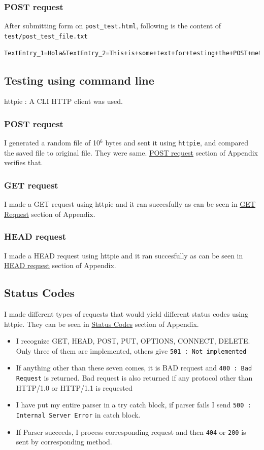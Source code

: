 \documentclass[11pt]{article}
\begin{document}
\subsubsection{POST request}
\label{sec:orgheadline13}
After submitting form on \texttt{post\_test.html}, following is the content of \texttt{test/post\_test\_file.txt}
\begin{verbatim}
TextEntry_1=Hola&TextEntry_2=This+is+some+text+for+testing+the+POST+method.%0D%0A&Item=Item_1
\end{verbatim}
\subsection{Testing using command line}
\label{sec:orgheadline20}
httpie : A CLI HTTP client was used.
\subsubsection{POST request}
\label{sec:orgheadline16}
I generated a random file of 10\(^{\text{6}}\) bytes and sent it using \texttt{httpie}, and compared the saved file to original file. They were same. 
 \hyperref[sec:orgheadline15]{POST request} section of Appendix verifies that.
\subsubsection{GET request}
\label{sec:orgheadline17}
I made a GET request using httpie and it ran succesfully as can be seen in \hyperref[sec:orgheadline11]{GET Request} section of Appendix.
\subsubsection{HEAD request}
\label{sec:orgheadline19}
I made a HEAD request using  httpie and it ran succesfully as can be seen in \hyperref[sec:orgheadline18]{HEAD request} section of Appendix.

\subsection{Status Codes}
\label{sec:orgheadline22}
I made different types of requests that would yield different status codes using httpie. They can be seen in \hyperref[sec:orgheadline21]{Status Codes} section of Appendix.
\begin{itemize}
\item I recognize GET, HEAD, POST, PUT, OPTIONS, CONNECT, DELETE. Only three of them are implemented, others give \texttt{501 : Not implemented}
\item If anything other than these seven comes, it is BAD request and \texttt{400 : Bad Request} is returned. Bad request is also returned if any protocol other than HTTP/1.0 or HTTP/1.1 is requested
\item I have put my entire parser in a try catch block, if parser fails I send \texttt{500 : Internal Server Error} in catch block.
\item If Parser succeeds, I process corresponding request and then \texttt{404} or \texttt{200} is sent by corresponding method.
\end{itemize}
\end{document}
